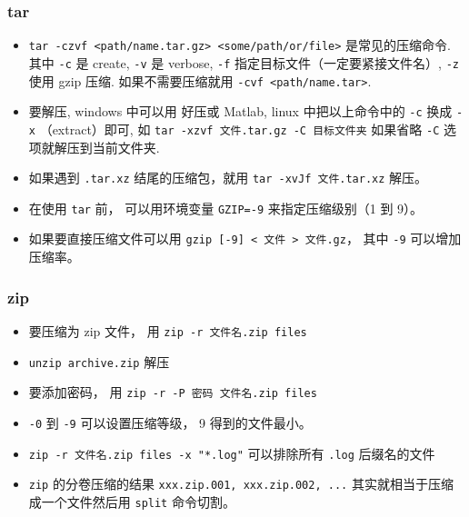 \subsubsection{tar}
\begin{itemize}
\item \verb`tar -czvf <path/name.tar.gz> <some/path/or/file>` 是常见的压缩命令. 其中 \verb`-c` 是 create, \verb`-v` 是 verbose, \verb`-f` 指定目标文件（一定要紧接文件名）, \verb`-z` 使用 gzip 压缩. 如果不需要压缩就用 \verb`-cvf <path/name.tar>`.
\item 要解压, windows 中可以用 好压或 Matlab, linux 中把以上命令中的 \verb`-c` 换成 \verb`-x` （extract）即可, 如 \verb`tar -xzvf 文件.tar.gz -C 目标文件夹` 如果省略 \verb`-C` 选项就解压到当前文件夹.
\item 如果遇到 \verb`.tar.xz` 结尾的压缩包，就用 \verb`tar -xvJf 文件.tar.xz` 解压。
\item 在使用 \verb`tar` 前， 可以用环境变量 \verb`GZIP=-9` 来指定压缩级别（1 到 9）。
\item 如果要直接压缩文件可以用 \verb`gzip [-9] < 文件 > 文件.gz`， 其中 \verb`-9` 可以增加压缩率。
\end{itemize}

\subsubsection{zip}
\begin{itemize}
\item 要压缩为 zip 文件， 用 \verb`zip -r 文件名.zip files`
\item \verb`unzip archive.zip` 解压
\item 要添加密码， 用 \verb`zip -r -P 密码 文件名.zip files`
\item \verb`-0` 到 \verb`-9` 可以设置压缩等级， 9 得到的文件最小。
\item \verb`zip -r 文件名.zip files -x "*.log"` 可以排除所有 \verb`.log` 后缀名的文件
\item \verb`zip` 的分卷压缩的结果 \verb`xxx.zip.001, xxx.zip.002, ...` 其实就相当于压缩成一个文件然后用 \verb`split` 命令切割。
\end{itemize}


